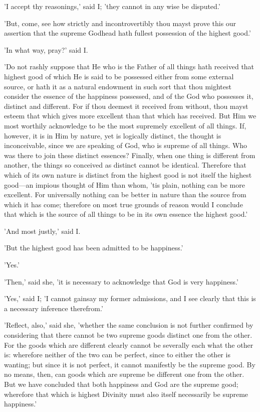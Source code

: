 'I accept thy reasonings,' said I; 'they cannot in any wise be
disputed.'

'But, come, see how strictly and incontrovertibly thou mayst prove this
our assertion that the supreme Godhead hath fullest possession of the
highest good.'

'In what way, pray?' said I.

'Do not rashly suppose that He who is the Father of all things hath
received that highest good of which He is said to be possessed either
from some external source, or hath it as a natural endowment in such
sort that thou mightest consider the essence of the happiness possessed,
and of the God who possesses it, distinct and different. For if thou
deemest it received from without, thou mayst esteem that which gives
more excellent than that which has received. But Him we most worthily
acknowledge to be the most supremely excellent of all things. If,
however, it is in Him by nature, yet is logically distinct, the thought
is inconceivable, since we are speaking of God, who is supreme of all
things. Who was there to join these distinct essences? Finally, when one
thing is different from another, the things so conceived as distinct
cannot be identical. Therefore that which of its own nature is distinct
from the highest good is not itself the highest good—an impious thought
of Him than whom, 'tis plain, nothing can be more excellent. For
universally nothing can be better in nature than the source from which
it has come; therefore on most true grounds of reason would I conclude
that which is the source of all things to be in its own essence the
highest good.'

'And most justly,' said I.

'But the highest good has been admitted to be happiness.'

'Yes.'

'Then,' said she, 'it is necessary to acknowledge that God is very
happiness.'

'Yes,' said I; 'I cannot gainsay my former admissions, and I see clearly
that this is a necessary inference therefrom.'

'Reflect, also,' said she, 'whether the same conclusion is not further
confirmed by considering that there cannot be two supreme goods distinct
one from the other. For the goods which are different clearly cannot be
severally each what the other is: wherefore neither of the two can be
perfect, since to either the other is wanting; but since it is not
perfect, it cannot manifestly be the supreme good. By no means, then,
can goods which are supreme be different one from the other. But we have
concluded that both happiness and God are the supreme good; wherefore
that which is highest Divinity must also itself necessarily be supreme
happiness.'

